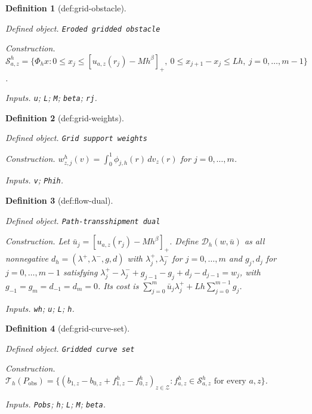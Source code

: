 \documentclass{article}
\newtheorem{definition}{Definition}
\begin{document}
\begin{definition}[def:grid-obstacle]\label{def:grid-obstacle}
\par\smallskip\noindent\emph{Defined object.} \texttt{Eroded gridded obstacle}
\par\smallskip\noindent\emph{Construction.} \(\mathcal S^h_{a,z}=\{\Phi_hx:0\le x_j\le[u_{a,z}(r_j)-Mh^\beta]_+,\ 0\le x_{j+1}-x_j\le Lh,\ j=0,\ldots,m-1\}\).
\par\smallskip\noindent\emph{Inputs.} \texttt{u}; \texttt{L}; \texttt{M}; \texttt{beta}; \texttt{rj}.
\end{definition}

\begin{definition}[def:grid-weights]\label{def:grid-weights}
\par\smallskip\noindent\emph{Defined object.} \texttt{Grid support weights}
\par\smallskip\noindent\emph{Construction.} \(w_{z,j}^h(v)=\int_{0}^{1}\phi_{j,h}(r)\,dv_z(r)\) for \(j=0,\ldots,m\).
\par\smallskip\noindent\emph{Inputs.} \texttt{v}; \texttt{Phih}.
\end{definition}

\begin{definition}[def:flow-dual]\label{def:flow-dual}
\par\smallskip\noindent\emph{Defined object.} \texttt{Path-\allowbreak{}transshipment dual}
\par\smallskip\noindent\emph{Construction.} Let \(\bar u_j=[u_{a,z}(r_j)-Mh^\beta]_+\). Define \(\mathcal D_h(w,\bar u)\) as all nonnegative \(d_h=(\lambda^+,\lambda^-,g,d)\) with \(\lambda_j^+,\lambda_j^-\) for \(j=0,\ldots,m\) and \(g_j,d_j\) for \(j=0,\ldots,m-1\) satisfying \(\lambda_j^+-\lambda_j^-+g_{j-1}-g_j+d_j-d_{j-1}=w_j\), with \(g_{-1}=g_m=d_{-1}=d_m=0\). Its cost is \(\sum_{j=0}^{m}\bar u_j\lambda_j^+ +Lh\sum_{j=0}^{m-1}g_j\).
\par\smallskip\noindent\emph{Inputs.} \texttt{wh}; \texttt{u}; \texttt{L}; \texttt{h}.
\end{definition}

\begin{definition}[def:grid-curve-set]\label{def:grid-curve-set}
\par\smallskip\noindent\emph{Defined object.} \texttt{Gridded curve set}
\par\smallskip\noindent\emph{Construction.} \(\mathcal T_h(P_{\mathrm{obs}})=\{(b_{1,z}-b_{0,z}+f^h_{1,z}-f^h_{0,z})_{z\in\mathcal Z}:f^h_{a,z}\in\mathcal S^h_{a,z}\text{ for every }a,z\}\).
\par\smallskip\noindent\emph{Inputs.} \texttt{Pobs}; \texttt{h}; \texttt{L}; \texttt{M}; \texttt{beta}.
\end{definition}
\end{document}
